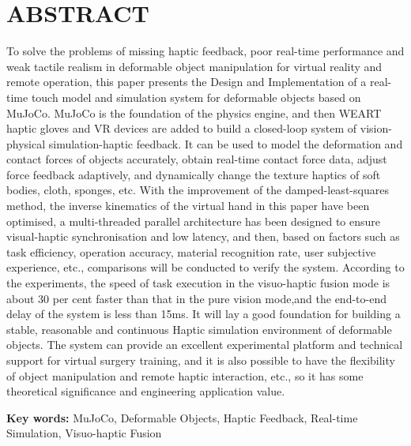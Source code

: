 \section*{ABSTRACT}
To solve the problems of missing haptic feedback, poor real-time performance and weak tactile realism in deformable object manipulation for virtual reality and remote operation, this paper presents the Design and Implementation of a real-time touch model and simulation system for deformable objects based on MuJoCo. MuJoCo is the foundation of the physics engine, and then WEART haptic gloves and VR devices are added to build a closed-loop system of vision-physical simulation-haptic feedback. It can be used to model the deformation and contact forces of objects accurately, obtain real-time contact force data, adjust force feedback adaptively, and dynamically change the texture haptics of soft bodies, cloth, sponges, etc. With the improvement of the damped-least-squares method, the inverse kinematics of the virtual hand in this paper have been optimised, a multi-threaded parallel architecture has been designed to ensure visual-haptic synchronisation and low latency, and then, based on factors such as task efficiency, operation accuracy, material recognition rate, user subjective experience, etc., comparisons will be conducted to verify the system. According to the experiments, the speed of task execution in the visuo-haptic fusion mode is about 30 per cent faster than that in the pure vision mode,and the end-to-end delay of the system is less than 15ms. It will lay a good foundation for building a stable, reasonable and continuous Haptic simulation environment of deformable objects. The system can provide an excellent experimental platform and technical support for virtual surgery training, and it is also possible to have the flexibility of object manipulation and remote haptic interaction, etc., so it has some theoretical significance and engineering application value.

\vspace{0.5cm}
\noindent\textbf{Key words:} MuJoCo, Deformable Objects, Haptic Feedback, Real-time Simulation, Visuo-haptic Fusion